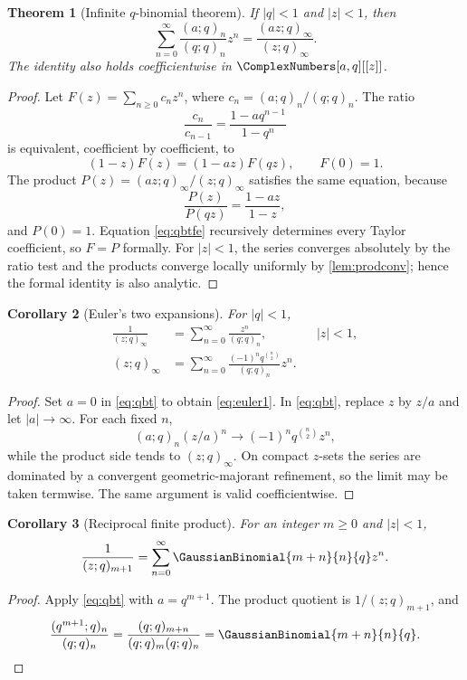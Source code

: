 \documentclass[11pt]{article}
\numberwithin{equation}{section}
\newtheorem{theorem}{Theorem}[section]
\newtheorem{corollary}[theorem]{Corollary}
\theoremstyle{definition}
\theoremstyle{remark}
\begin{document}
\begin{theorem}[Infinite $q$-binomial theorem]\label{thm:qbt}
If $|q|<1$ and $|z|<1$, then
\begin{equation}\label{eq:qbt}
\sum_{n=0}^{\infty}\frac{(a;q)_n}{(q;q)_n}z^n
=\frac{(az;q)_\infty}{(z;q)_\infty}.
\end{equation}
The identity also holds coefficientwise in $\ComplexNumbers[a,q][[z]]$.
\end{theorem}
\begin{proof}
Let
\(F(z)=\sum_{n\ge0}c_nz^n\), where
$c_n=(a;q)_n/(q;q)_n$.  The ratio
\[
\frac{c_n}{c_{n-1}}=\frac{1-aq^{n-1}}{1-q^n}
\]
is equivalent, coefficient by coefficient, to
\begin{equation}\label{eq:qbtfe}
(1-z)F(z)=(1-az)F(qz),\qquad F(0)=1.
\end{equation}
The product
$P(z)=(az;q)_\infty/(z;q)_\infty$ satisfies the same equation, because
\[
\frac{P(z)}{P(qz)}=\frac{1-az}{1-z},
\]
and $P(0)=1$.  Equation \eqref{eq:qbtfe} recursively determines every Taylor
coefficient, so $F=P$ formally.  For $|z|<1$, the series converges absolutely
by the ratio test and the products converge locally uniformly by
\cref{lem:prodconv}; hence the formal identity is also analytic.
\end{proof}

\begin{corollary}[Euler's two expansions]\label{cor:eulerexp}
For $|q|<1$,
\begin{align}
\frac1{(z;q)_\infty}&=\sum_{n=0}^{\infty}\frac{z^n}{(q;q)_n},
&& |z|<1,\label{eq:euler1}\\
(z;q)_\infty&=\sum_{n=0}^{\infty}
\frac{(-1)^nq^{\binom n2}}{(q;q)_n}z^n.
\label{eq:euler2}
\end{align}
\end{corollary}
\begin{proof}
Set $a=0$ in \eqref{eq:qbt} to obtain \eqref{eq:euler1}.  In
\eqref{eq:qbt}, replace $z$ by $z/a$ and let $|a|\to\infty$.  For each fixed
$n$,
\[
(a;q)_n(z/a)^n\longrightarrow(-1)^nq^{\binom n2}z^n,
\]
while the product side tends to $(z;q)_\infty$.  On compact $z$-sets the
series are dominated by a convergent geometric-majorant refinement, so the
limit may be taken termwise.  The same argument is valid coefficientwise.
\end{proof}

\begin{corollary}[Reciprocal finite product]\label{cor:reciprocalfinite}
For an integer $m\ge0$ and $|z|<1$,
\[
\frac1{(z;q)_{m+1}}=
\sum_{n=0}^{\infty}\GaussianBinomial{m+n}{n}{q}z^n.
\]
\end{corollary}
\begin{proof}
Apply \eqref{eq:qbt} with $a=q^{m+1}$.  The product quotient is
$1/(z;q)_{m+1}$, and
\[
\frac{(q^{m+1};q)_n}{(q;q)_n}
=\frac{(q;q)_{m+n}}{(q;q)_m(q;q)_n}=\GaussianBinomial{m+n}{n}{q}.
\]
\end{proof}
\end{document}
